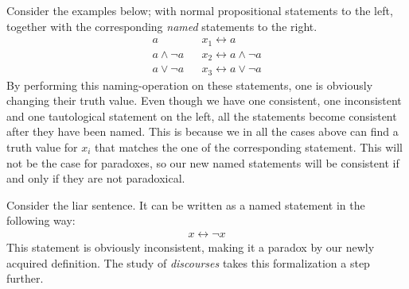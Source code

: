 Consider the examples below; with normal propositional statements to the left, together with the corresponding \textit{named} statements to the right.
\begin{align}
  a               && x_1 \leftrightarrow a\\
  a \wedge \neg a && x_2 \leftrightarrow a \wedge \neg a\\
  a \vee \neg a   && x_3 \leftrightarrow a \vee \neg a
\end{align}
By performing this naming-operation on these statements, one is obviously changing their truth value.
Even though we have one consistent, one inconsistent and one tautological statement on the left, all the statements become consistent after they have been named.
This is because we in all the cases above can find a truth value for $x_i$ that matches the one of the corresponding statement.
This will not be the case for paradoxes, so our new named statements will be consistent if and only if they are not paradoxical.

Consider the liar sentence.  It can be written as a named statement in the following way:
\begin{align}
  x \leftrightarrow \neg x
\end{align}
This statement is obviously inconsistent, making it a paradox by our newly acquired definition.  The study of \textit{discourses} takes this formalization a step further.
